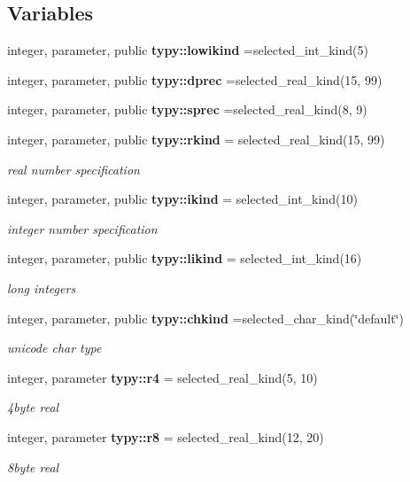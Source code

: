 \subsection*{Variables}
\begin{DoxyCompactItemize}
\item 
integer, parameter, public {\bf typy\+::lowikind} =selected\+\_\+int\+\_\+kind(5)
\item 
integer, parameter, public {\bf typy\+::dprec} =selected\+\_\+real\+\_\+kind(15, 99)
\item 
integer, parameter, public {\bf typy\+::sprec} =selected\+\_\+real\+\_\+kind(8, 9)
\item 
integer, parameter, public {\bf typy\+::rkind} = selected\+\_\+real\+\_\+kind(15, 99)
\begin{DoxyCompactList}\small\item\em real number specification \end{DoxyCompactList}\item 
integer, parameter, public {\bf typy\+::ikind} = selected\+\_\+int\+\_\+kind(10)
\begin{DoxyCompactList}\small\item\em integer number specification \end{DoxyCompactList}\item 
integer, parameter, public {\bf typy\+::likind} = selected\+\_\+int\+\_\+kind(16)
\begin{DoxyCompactList}\small\item\em long integers \end{DoxyCompactList}\item 
integer, parameter, public {\bf typy\+::chkind} =selected\+\_\+char\+\_\+kind(\char`\"{}default\char`\"{})
\begin{DoxyCompactList}\small\item\em unicode char type \end{DoxyCompactList}\item 
integer, parameter {\bf typy\+::r4} = selected\+\_\+real\+\_\+kind(5, 10)
\begin{DoxyCompactList}\small\item\em 4byte real \end{DoxyCompactList}\item 
integer, parameter {\bf typy\+::r8} = selected\+\_\+real\+\_\+kind(12, 20)
\begin{DoxyCompactList}\small\item\em 8byte real \end{DoxyCompactList}\item 

\end{DoxyCompactItemize}
